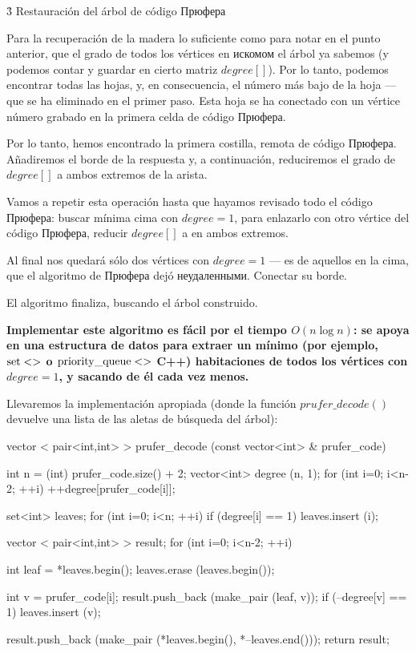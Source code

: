 \h3{ Restauración del árbol de código Прюфера }

Para la recuperación de la madera lo suficiente como para notar en el punto anterior, que el grado de todos los vértices en искомом el árbol ya sabemos (y podemos contar y guardar en cierto matriz $degree[]$). Por lo tanto, podemos encontrar todas las hojas, y, en consecuencia, el número más bajo de la hoja --- que se ha eliminado en el primer paso. Esta hoja se ha conectado con un vértice número grabado en la primera celda de código Прюфера.

Por lo tanto, hemos encontrado la primera costilla, remota de código Прюфера. Añadiremos el borde de la respuesta y, a continuación, reduciremos el grado de $degree[]$ a ambos extremos de la arista.

Vamos a repetir esta operación hasta que hayamos revisado todo el código Прюфера: buscar mínima cima con $degree = 1$, para enlazarlo con otro vértice del código Прюфера, reducir $degree[]$ a en ambos extremos.

Al final nos quedará sólo dos vértices con $degree = 1$ --- es de aquellos en la cima, que el algoritmo de Прюфера dejó неудаленными. Conectar su borde.

El algoritmo finaliza, buscando el árbol construido.

\bf{Implementar} este algoritmo es fácil por el tiempo $O (n \log n)$: se apoya en una estructura de datos para extraer un mínimo (por ejemplo, $\rm set<>$ o $\rm priority\_queue<>$ C++) habitaciones de todos los vértices con $degree=1$, y sacando de él cada vez menos.

Llevaremos la implementación apropiada (donde la función $prufer\_decode()$ devuelve una lista de las aletas de búsqueda del árbol):

\code
vector < pair<int,int> > prufer_decode (const vector<int> & prufer_code) {
int n = (int) prufer_code.size() + 2;
vector<int> degree (n, 1);
for (int i=0; i<n-2; ++i)
++degree[prufer_code[i]];

set<int> leaves;
for (int i=0; i<n; ++i)
if (degree[i] == 1)
leaves.insert (i);

vector < pair<int,int> > result;
for (int i=0; i<n-2; ++i) {
int leaf = *leaves.begin();
leaves.erase (leaves.begin());

int v = prufer_code[i];
result.push_back (make_pair (leaf, v));
if (--degree[v] == 1)
leaves.insert (v);
}
result.push_back (make_pair (*leaves.begin(), *--leaves.end()));
return result;
}
\endcode


